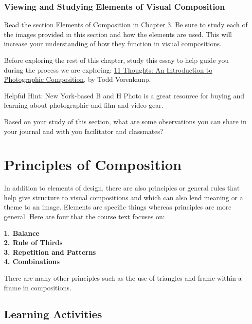 \documentclass[
]{book}
\begin{document}
\hypertarget{viewing-and-studying-elements-of-visual-composition}{%
\subsubsection*{Viewing and Studying Elements of Visual Composition}\label{viewing-and-studying-elements-of-visual-composition}}

Read the section Elements of Composition in Chapter 3. Be sure to study each of the images provided in this section and how the elements are used. This will increase your understanding of how they function in visual compositions.

Before exploring the rest of this chapter, study this essay to help guide you during the process we are exploring: \href{https://www.bhphotovideo.com/explora/photography/tips-and-solutions/11-thoughts-introduction-photographic-composition}{11 Thoughts: An Introduction to Photographic Composition}, by Todd Vorenkamp.

Helpful Hint: New York-based B and H Photo is a great resource for buying and learning about photographic and film and video gear.

Based on your study of this section, what are some observations you can share in your journal and with you facilitator and classmates?

\hypertarget{principles-of-composition}{%
\section*{Principles of Composition}\label{principles-of-composition}}

In addition to elements of design, there are also principles or general rules that help give structure to visual compositions and which can also lend meaning or a theme to an image. Elements are specific things whereas principles are more general. Here are four that the course text focuses on:

\textbf{1. Balance}\\
\textbf{2. Rule of Thirds}\\
\textbf{3. Repetition and Patterns}\\
\textbf{4. Combinations}

There are many other principles such as the use of triangles and frame within a frame in compositions.

\hypertarget{learning-activities-10}{%
\subsection*{Learning Activities}\label{learning-activities-10}}
\end{document}
